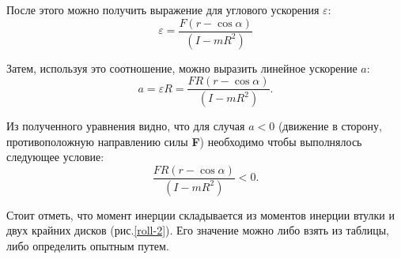 \documentclass[14pt,a4paper,oneside]{extarticle}	%
\begin{document}
После этого можно получить выражение для углового ускорения $ \varepsilon $:
\begin{equation}\label{roll-eq5}
\varepsilon = \frac{F(r -\cos\alpha)}{(I  - mR^{2})}
\end{equation}

Затем, используя это соотношение, можно выразить линейное ускорение $ a $:
\begin{equation}\label{roll-eq6}
a = \varepsilon R = \frac{FR(r -\cos\alpha)}{(I  - mR^{2})}.
\end{equation}

Из полученного уравнения видно, что для случая $ a<0 $ (движение в сторону, противоположную направлению силы \textbf{F}) необходимо чтобы выполнялось следующее условие: $$ \frac{FR(r -\cos\alpha)}{(I  - mR^{2})} < 0.$$ 

Стоит отметь, что момент инерции складывается из моментов инерции втулки и двух крайних дисков (рис.\ref{roll-2}).
Его значение можно либо взять из таблицы, либо определить опытным путем.  
\end{document}

